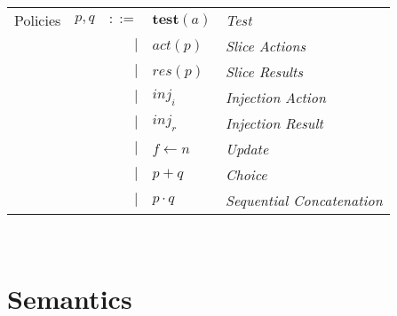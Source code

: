 \documentclass[12pt, letterpaper]{article}
\begin{document}
  \begin{tabular}{l c r l l}
    Policies  & $p,q$ & $::=$  & $\mathbf{test}(a)$ & \textit{Test}     \\
              &       & $\mid$ & $act(p)$           & \textit{Slice Actions}    \\
              &       & $\mid$ & $res(p)$           & \textit{Slice Results}    \\
              &       & $\mid$ & $inj_{i}$          & \textit{Injection Action} \\
              &       & $\mid$ & $inj_{r}$          & \textit{Injection Result} \\
              &       & $\mid$ & $f \leftarrow n$   & \textit{Update}   \\
              &       & $\mid$ & $p + q$            & \textit{Choice}   \\
              &       & $\mid$ & $p \cdot q$        & \textit{Sequential Concatenation} \\
  \end{tabular}\\


\newpage
\section{Semantics}
\end{document}
